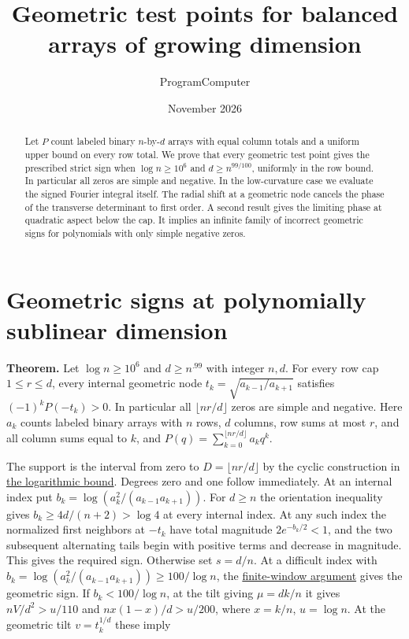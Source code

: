 \documentclass[11pt]{article}
\title{Geometric test points for balanced arrays of growing dimension}
\author{ProgramComputer}
\date{November 2026}
\begin{document}
\maketitle
\begin{abstract}
Let $P$ count labeled binary $n$-by-$d$ arrays with equal column totals and a uniform upper bound on every row total. We prove that every geometric test point gives the prescribed strict sign when $\log n\ge10^6$ and $d\ge n^{99/100}$, uniformly in the row bound. In particular all zeros are simple and negative. In the low-curvature case we evaluate the signed Fourier integral itself. The radial shift at a geometric node cancels the phase of the transverse determinant to first order. A second result gives the limiting phase at quadratic aspect below the cap. It implies an infinite family of incorrect geometric signs for polynomials with only simple negative zeros.
\end{abstract}
\section{Geometric signs at polynomially sublinear dimension}

\textbf{Theorem.} Let $\log n\ge10^6$ and $d\ge n^{.99}$ with integer $n,d$. For every row cap $1\le r\le d$, every internal geometric node $t_k=\sqrt{a_{k-1}/a_{k+1}}$ satisfies $(-1)^kP(-t_k)>0$. In particular all $\lfloor nr/d\rfloor$ zeros are simple and negative. Here $a_k$ counts labeled binary arrays with $n$ rows, $d$ columns, row sums at most $r$, and all column sums equal to $k$, and $P(q)=\sum_{k=0}^{\lfloor nr/d\rfloor}a_kq^k$.

The support is the interval from zero to $D=\lfloor nr/d\rfloor$ by the cyclic construction in \href{https://github.com/ProgramComputer/open-math-research/blob/main/topics/balanced-arrays/effective-sublinear/README.md}{the logarithmic bound}. Degrees zero and one follow immediately. At an internal index put $b_k=\log(a_k^2/(a_{k-1}a_{k+1}))$. For $d\ge n$ the orientation inequality gives $b_k\ge4d/(n+2)>\log4$ at every internal index. At any such index the normalized first neighbors at $-t_k$ have total magnitude $2e^{-b_k/2}<1$, and the two subsequent alternating tails begin with positive terms and decrease in magnitude. This gives the required sign. Otherwise set $s=d/n$. At a difficult index with $b_k=\log(a_k^2/(a_{k-1}a_{k+1}))\ge100/\log n$, the \href{https://github.com/ProgramComputer/open-math-research/blob/main/topics/balanced-arrays/effective-sublinear/angular-overlap.md}{finite-window argument} gives the geometric sign. If $b_k<100/\log n$, at the tilt giving $\mu=dk/n$ it gives $nV/d^2>u/110$ and $nx(1-x)/d>u/200$, where $x=k/n$, $u=\log n$. At the geometric tilt $v=t_k^{1/d}$ these imply
\end{document}
